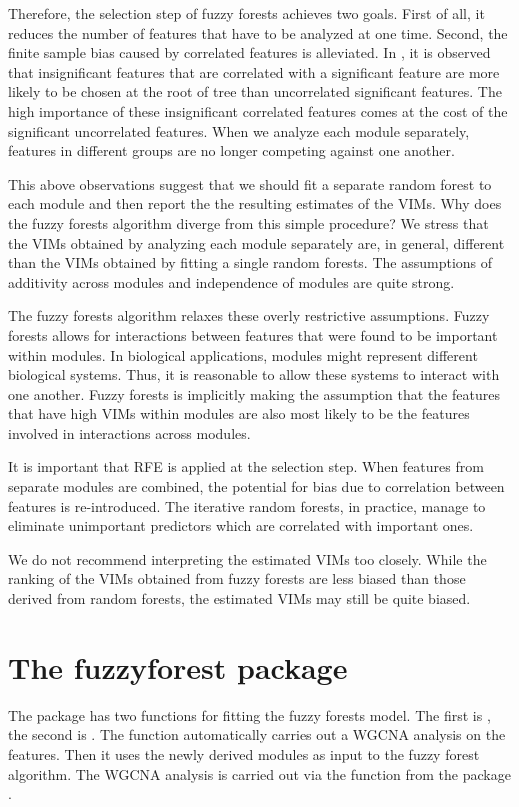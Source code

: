 \documentclass[article,shortnames]{jss}
\begin{document}
Therefore, the selection step of fuzzy forests achieves two goals.  First of all, it reduces the number of features that have to be 
analyzed at one time.  Second, the finite sample bias caused by correlated features is alleviated.  In 
\citep{nicodemus2009predictor}, it is observed that insignificant features that are correlated with a significant feature 
are more likely to be chosen at the root of tree than uncorrelated significant features.  The high importance of these insignificant
correlated features comes at the cost of the significant uncorrelated features.  When we analyze each module separately, features 
in different groups are no longer competing against one another.   

This above observations suggest that we should fit a separate random forest to each module and then report the the resulting
estimates of the VIMs.  Why does the fuzzy forests algorithm diverge from this simple procedure?
We stress that the VIMs obtained by analyzing each module separately are, in general, different than the VIMs obtained
by fitting a single random forests.  The assumptions of additivity across modules and independence of modules are quite strong.

The fuzzy forests algorithm relaxes these overly restrictive assumptions.  Fuzzy forests allows for interactions between features that
were found to be important within modules.  In biological applications, modules might represent different biological systems.
Thus, it is reasonable to allow these systems to interact with one another.  
Fuzzy forests is implicitly making the assumption that the features that have high VIMs within modules are also most likely to be the features
involved in interactions across modules.   

It is important that RFE is applied at the selection step.  When features from separate modules are combined,
the potential for bias due to correlation between features is re-introduced.  The iterative random forests, in practice, manage to
eliminate unimportant predictors which are correlated with important ones.  

We do not recommend interpreting the estimated VIMs too closely.  While the ranking of the VIMs obtained from
fuzzy forests are less biased than those derived from random forests, the estimated VIMs may still be quite biased.

\section{The fuzzyforest package}
The package   has two functions for fitting the fuzzy forests model.  The first is , the
second is .  The function  automatically carries out a WGCNA analysis on the features.
Then it uses the newly derived modules as input to the fuzzy forest algorithm.  The WGCNA analysis is carried out via the 
 function from the package .  
\end{document}
